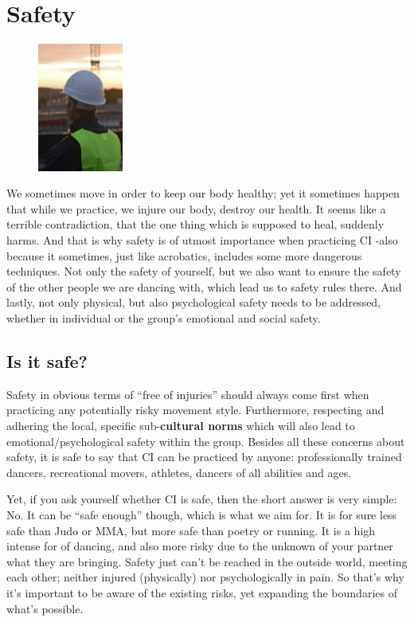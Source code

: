 \section{Safety}\label{sec:safety}

\begin{figure}
    \centering
    \includegraphics[width=0.25\textwidth]{images/safety}
\end{figure}

We sometimes move in order to keep our body healthy; yet it sometimes happen that while we practice, we injure our body, destroy our health.
It seems like a terrible contradiction, that the one thing which is supposed to heal, suddenly harms.
And that is why safety is of utmost importance when practicing CI -also because it sometimes, just like acrobatics, includes some more dangerous techniques.
Not only the safety of yourself, but we also want to ensure the safety of the other people we are dancing with, which lead us to safety rules there.
And lastly, not only physical, but also psychological safety needs to be addressed, whether in individual or the group's emotional and social safety.

\subsection{Is it safe?}\label{subsec:is-it-safe?}

Safety in obvious terms of ``free of injuries'' should always come first when practicing any potentially risky movement style.
Furthermore, respecting and adhering the local, specific sub-\textbf{cultural norms} which will also lead to emotional/psychological safety within the group.
Besides all these concerns about safety, it is safe to say that CI can be practiced by anyone: professionally trained dancers, recreational movers, athletes, dancers of all abilities and ages.

Yet, if you ask yourself whether CI is safe, then the short answer is very simple: No.
It can be ``safe enough'' though, which is what we aim for.
It is for sure less safe than Judo or MMA, but more safe than poetry or running.
It is a high intense for of dancing, and also more risky due to the unknown of your partner what they are bringing.
Safety just can't be reached in the outside world, meeting each other;
neither injured (physically) nor psychologically in pain.
So that's why it's important to be aware of the existing risks, yet expanding the boundaries of what's possible.

